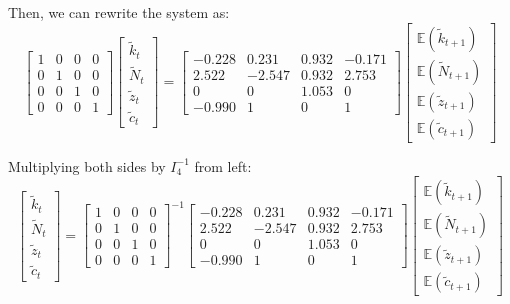 \documentclass[12pt]{extarticle}
\newcommand{\expec}[1]{\mathbb{E}\left(#1\right)}
\begin{document}
Then, we can rewrite the system as:
$$\begin{bmatrix} 1 & 0 & 0 & 0 \\ 0 & 1 & 0 & 0 \\ 0 & 0 & 1 & 0 \\ 0 & 0 & 0 & 1 \end{bmatrix} \begin{bmatrix} \tilde{k}_t \\ \tilde{N}_t \\ \tilde{z}_t \\ \tilde{c}_t \end{bmatrix} = \begin{bmatrix} -0.228 & 0.231 & 0.932 & -0.171 \\ 2.522 & -2.547 & 0.932 & 2.753 \\ 0 & 0 & 1.053 & 0 \\ -0.990 & 1 & 0 & 1 \end{bmatrix} \begin{bmatrix} \expec{\tilde{k}_{t+1}} \\ \expec{\tilde{N}_{t+1}} \\ \expec{\tilde{z}_{t+1}} \\ \expec{\tilde{c}_{t+1}} \end{bmatrix}$$

Multiplying both sides by $I_4^{-1}$ from left:
$$\begin{bmatrix} \tilde{k}_t \\ \tilde{N}_t \\ \tilde{z}_t \\ \tilde{c}_t \end{bmatrix} = \begin{bmatrix} 1 & 0 & 0 & 0 \\ 0 & 1 & 0 & 0 \\ 0 & 0 & 1 & 0 \\ 0 & 0 & 0 & 1 \end{bmatrix}^{-1} \begin{bmatrix} -0.228 & 0.231 & 0.932 & -0.171 \\ 2.522 & -2.547 & 0.932 & 2.753 \\ 0 & 0 & 1.053 & 0 \\ -0.990 & 1 & 0 & 1 \end{bmatrix} \begin{bmatrix} \expec{\tilde{k}_{t+1}} \\ \expec{\tilde{N}_{t+1}} \\ \expec{\tilde{z}_{t+1}} \\ \expec{\tilde{c}_{t+1}} \end{bmatrix}$$
\end{document}
